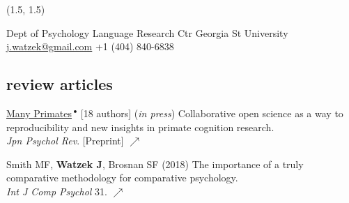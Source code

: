 \documentclass[]{friggeri-cv}
\begin{document}
\renewenvironment{aside}{%
  \let\oldsection\section
  \renewcommand{\section}[1]{
    \par\vspace{\baselineskip}{\Large\headingfont\color{headercolor} ##1}
  }
  \begin{textblock}{3.6}(1.5, 1.5)
  \begin{flushright}
  \obeycr
}{%
  \restorecr
  \end{flushright}
  \end{textblock}
  \let\section\oldsection
}


\begin{aside}
  \section{{\normalfont julia}watzek}
    Dept of Psychology
    Language Research Ctr
    Georgia St University
    ~
    \href{mailto:j.watzek@gmail.com}{j.watzek@gmail.com}
    +1 (404) 840-6838
\end{aside}


\subsection{review articles}

\begin{enumerate}[resume, label={[\,\arabic*\,]}]
  \item \ul{Many Primates}\,${}^\bullet$ [18 authors] (\emph{in press}) Collaborative open science as a way to reproducibility and new insights in primate cognition research. \\\emph{Jpn Psychol Rev}. [Preprint] \href{https://doi.org/10.31234/osf.io/8w7zd}{\small $\nearrow$}
  \item {Smith MF, \textbf{Watzek J}, Brosnan SF (2018) The importance of a truly comparative methodology for comparative psychology. \\\emph{Int J Comp Psychol} 31. \href{https://escholarship.org/uc/item/6x91j98x}{\small $\nearrow$}}
\end{enumerate}
\end{document}
